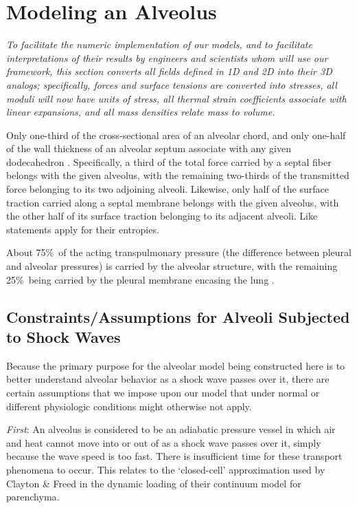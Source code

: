 \section{Modeling an Alveolus}
\label{secAlveolus}

\textit{To facilitate the numeric implementation of our models, and to facilitate interpretations of their results by engineers and scientists whom will use our framework, this section converts all fields defined in 1D and 2D into their 3D analogs; specifically, forces and surface tensions are converted into stresses, all moduli will now have units of stress, all thermal strain coefficients associate with linear expansions, and all mass densities relate mass to volume.}

Only one-third of the cross-sectional area of an alveolar chord, and only one-half of the wall thickness of an alveolar septum associate with any given dodecahedron \cite{Kimmeletal87}.  Specifically, a third of the total force carried by a septal fiber belongs with the  given alveolus, with the remaining two-thirds of the transmitted force belonging to its two adjoining alveoli.  Likewise, only half of the surface traction carried along a septal membrane belongs with the given alveolus, with the other half of its surface traction belonging to its adjacent alveoli.  Like statements apply for their entropies.

About 75\%\ of the acting transpulmonary pressure (the difference between pleural and alveolar pressures) is carried by the alveolar structure, with the remaining 25\%\ being carried by the pleural membrane encasing the lung \cite{Hajjietal79}.

\subsection{Constraints\slash Assumptions for Alveoli Subjected to Shock Waves}

Because the primary purpose for the alveolar model being constructed here is to better understand alveolar behavior as a shock wave passes over it, there are certain assumptions that we impose upon our model that under normal or different physiologic conditions might otherwise not apply.  

\textit{First\/}: An alveolus is considered to be an adiabatic pressure vessel in which air and heat cannot move into or out of as a shock wave passes over it, simply because the wave speed is too fast.  There is insufficient time for these transport phenomena to occur.  This relates to the `closed-cell' approximation used by Clayton \& Freed \cite{ClaytonFreed20} in the dynamic loading of their continuum model for parenchyma.

